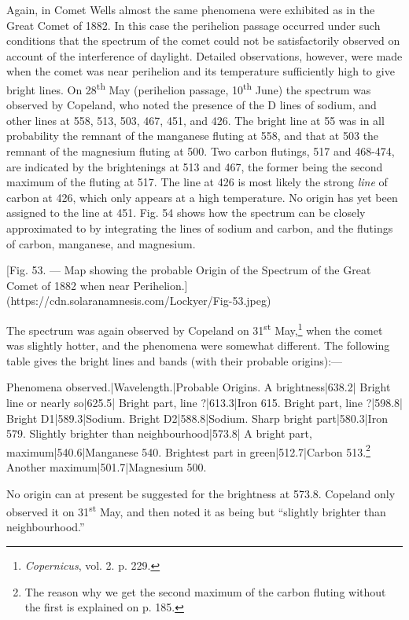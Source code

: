 \documentclass[a4paper, 12pt, oneside, polutonikogreek, english]{article}
\begin{document}
Again, in Comet Wells almost the same phenomena were exhibited as in the Great Comet of 1882. In this case the perihelion passage occurred under such conditions that the spectrum of the comet could not be satisfactorily observed on account of the interference of daylight. Detailed observations, however, were made when the comet was near perihelion and its temperature sufficiently high to give bright lines. On 28\textsuperscript{th} May (perihelion passage, 10\textsuperscript{th} June) the spectrum was observed by Copeland, who noted the presence of the D lines of sodium, and other lines at 558, 513, 503, 467, 451, and 426. The bright line at 55 was in all probability the remnant of the manganese fluting at 558, and that at 503 the remnant of the magnesium fluting at 500. Two carbon flutings, 517 and 468-474, are indicated by the brightenings at 513 and 467, the former being the second maximum of the fluting at 517. The line at 426 is most likely the strong \emph{line} of carbon at 426, which only appears at a high temperature. No origin has yet been assigned to the line at 451. Fig. 54 shows how the spectrum can be closely approximated to by integrating the lines of sodium and carbon, and the flutings of carbon, manganese, and magnesium.

[Fig. 53. --- Map showing the probable Origin of the Spectrum of the Great Comet of 1882 when near Perihelion.](https://cdn.solaranamnesis.com/Lockyer/Fig-53.jpeg)

The spectrum was again observed by Copeland on 31\textsuperscript{st} May,\footnote{\emph{Copernicus}, vol. 2. p. 229.} when the comet was slightly hotter, and the phenomena were somewhat different. The following table gives the bright lines and bands (with their probable origins):---

Phenomena observed.|Wavelength.|Probable Origins. 
A brightness|638.2| 
Bright line or nearly so|625.5| 
Bright part, line ?|613.3|Iron 615. 
Bright part, line ?|598.8| 
Bright D1|589.3|Sodium. 
Bright D2|588.8|Sodium. 
Sharp bright part|580.3|Iron 579. 
Slightly brighter than neighbourhood|573.8| 
A bright part, maximum|540.6|Manganese 540. 
Brightest part in green|512.7|Carbon 513.\footnote{The reason why we get the second maximum of the carbon fluting without the first is explained on p. 185.} 
Another maximum|501.7|Magnesium 500.

No origin can at present be suggested for the brightness at 573.8. Copeland only observed it on 31\textsuperscript{st} May, and then noted it as being but ``slightly brighter than neighbourhood.''
\end{document}
